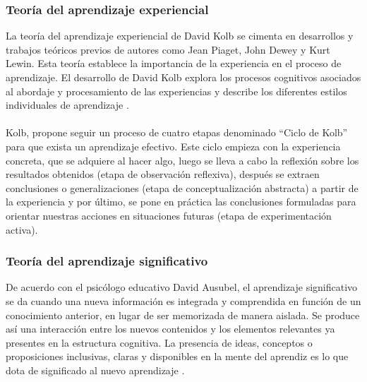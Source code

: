 \subsubsection{Teoría del aprendizaje experiencial}
La teoría del aprendizaje experiencial de David Kolb se cimenta en desarrollos y trabajos teóricos previos de autores como Jean Piaget, John Dewey y Kurt Lewin. Esta teoría establece la importancia de la experiencia en el proceso de aprendizaje. El desarrollo de David Kolb explora los procesos cognitivos asociados al abordaje y procesamiento de las experiencias y describe los diferentes estilos individuales de aprendizaje \cite{GomezPawelek2011}.
\\
\\
Kolb, propone seguir un proceso de cuatro etapas denominado “Ciclo de Kolb” para que exista un aprendizaje efectivo. Este ciclo empieza con la experiencia concreta, que se adquiere al hacer algo, luego se lleva a cabo la reflexión sobre los resultados obtenidos (etapa de observación reflexiva), después se extraen conclusiones o generalizaciones (etapa de conceptualización abstracta) a partir de la experiencia y por último, se pone en práctica las conclusiones formuladas para orientar nuestras acciones en situaciones futuras (etapa de experimentación activa).

\subsubsection{Teoría del aprendizaje significativo}
De acuerdo con el psicólogo educativo David Ausubel, el aprendizaje significativo se da cuando una nueva información es integrada y comprendida en función de un conocimiento anterior, en lugar de ser memorizada de manera aislada. Se produce así una interacción entre los nuevos contenidos y los elementos relevantes ya presentes en la estructura cognitiva. La presencia de ideas, conceptos o proposiciones inclusivas, claras y disponibles en la mente del aprendiz es lo que dota de significado al nuevo aprendizaje \cite{PalmeroRodriguez2024}.

